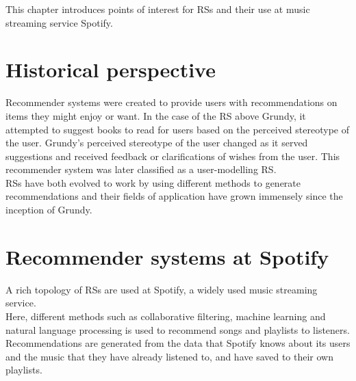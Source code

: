 
This chapter introduces points of interest for RSs and their use at music streaming service Spotify.

\section{Historical perspective}

Recommender systems were created to provide users with recommendations on items they might enjoy or want. In the case of the RS above Grundy, it attempted to suggest books to read for users based on the perceived stereotype of the user. Grundy's perceived stereotype of the user changed as it served suggestions and received feedback or clarifications of wishes from the user. This recommender system was later classified as a user-modelling RS.\\

RSs have both evolved to work by using different methods to generate recommendations and their fields of application have grown immensely since the inception of Grundy.

\section{Recommender systems at Spotify}

A rich topology of RSs are used at Spotify, a widely used music streaming service.\\

Here, different methods such as collaborative filtering, machine learning and natural language processing is used to recommend songs and playlists to listeners. Recommendations are generated from the data that Spotify knows about its users and the music that they have already listened to, and have saved to their own playlists.












